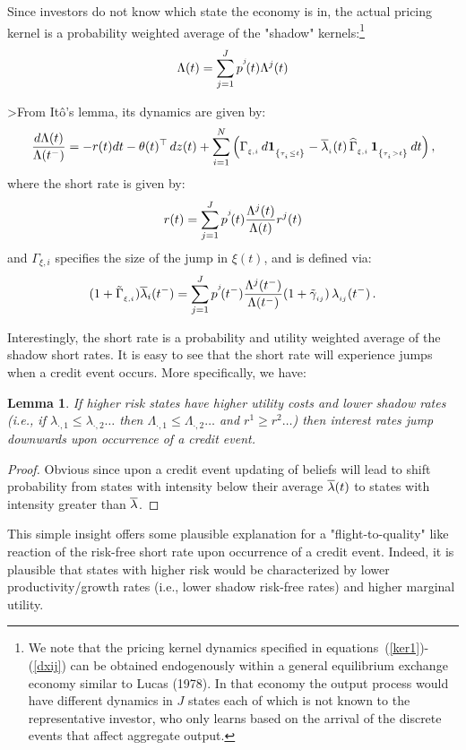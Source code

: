 \documentclass[titlepage,11pt]{article}
\def\bq{\begin{equation}}
\def\eq{\end{equation}}
\newtheorem{proof}{Proof}
\newtheorem{lemma}{Lemma}
\begin{document}
Since investors do not know which state the economy is in, the
actual pricing kernel is a probability weighted average of the
"shadow" kernels:\footnote{We note that the pricing kernel dynamics
specified in equations~(\ref{ker1})-(\ref{dxij}) can be obtained
endogenously within a general equilibrium exchange economy similar
to Lucas (1978).\nocite{luc78} In that economy the output process
would have different dynamics in $J$ states each of which is not
known to the representative investor, who only learns based on the
arrival of the discrete events that affect aggregate output.}
 \bq\label{ker1} \Lambda(t) =\sum_{j=1}^J \pj(t) \Lambda^j(t) \eq

>From It\^o's lemma, its dynamics are given by: \bq\label{dxi}
\frac{d\Lambda(t)}{\Lambda(t^-)} =-r(t)dt -\theta(t)^\top \, dz(t) +
\sum_{i=1}^N \left(\Gamma\sub{\xi,i} \, d\ind{\tau\sub{i}\leq t} -
\lb\sub{i}(t) \, \HG\sub{\xi,i} \, \ind{\tau\sub{i}>t} \, dt
\right), \eq where the short rate is given by: \bq r(t)=\sum_{j=1}^J
\pj(t)\frac{\Lambda^j(t)}{\Lambda(t)}r^j(t) \eq and $\Gamma_{\xi,i}$
specifies the size of the jump in $\xi(t)$, and is defined via:
\bq\label{gamxii} (1 + \tilde{\Gamma}\sub{\xi,i})\lb_i(t^-)=
\sum_{j=1}^J \pj(\tm)\frac{\Lambda^j(t^-)}{
\Lambda(t^-)}(1+\tilde{\gamma}\sub{ij}) \, \lij(t^-) \, . \eq

Interestingly, the short rate is a probability and utility weighted
average of the shadow short rates.  It is easy to see that the short
rate will experience jumps when a credit event occurs. More
specifically, we have:
\begin{lemma}\label{Qint}
If higher risk states have higher utility costs and lower shadow
rates (i.e., if $\lambda_{\cdot,1}\leq\lambda_{\cdot,2}\ldots$ then
$\Lambda_{\cdot,1}\leq\Lambda_{\cdot,2}\ldots$ and $r^1\geq
r^2\ldots$) then interest rates jump downwards upon occurrence of a
credit event.
\end{lemma}
\begin{proof}
Obvious since upon a credit event updating of beliefs will lead to
shift probability from states with intensity below their average
$\overline{\lambda}(t)$ to states with intensity greater than $\overline{\lambda}$.
\end{proof}
This simple insight offers some plausible explanation for a
"flight-to-quality" like reaction of the risk-free short rate upon
occurrence of a credit event. Indeed, it is plausible that states
with higher risk would be characterized by lower productivity/growth
rates (i.e., lower shadow risk-free rates) and higher marginal
utility.
\end{document}
